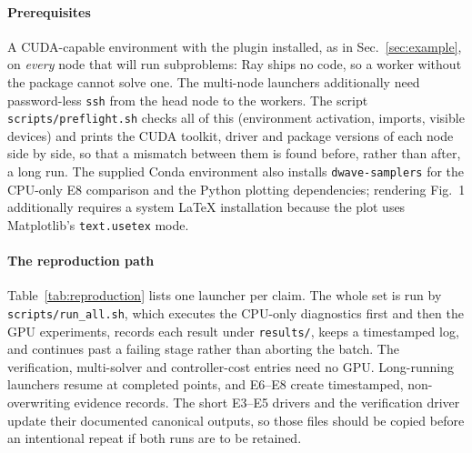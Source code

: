 \documentclass[12pt,a4paper]{elsarticle}
\begin{document}
\paragraph{Prerequisites}
A CUDA-capable environment with the plugin installed, as in
Sec.~\ref{sec:example}, on \emph{every} node that will run subproblems: Ray
ships no code, so a worker without the package cannot solve one. The
multi-node launchers additionally need password-less \texttt{ssh} from the head
node to the workers. The script \texttt{scripts/preflight.sh} checks all of
this (environment activation, imports, visible devices) and prints the CUDA
toolkit, driver and package versions of each node side by side, so that a
mismatch between them is found before, rather than after, a long run.
The supplied Conda environment also installs \texttt{dwave-samplers} for the CPU-only E8
comparison and the Python plotting dependencies; rendering Fig.~1 additionally requires a
system \LaTeX{} installation because the plot uses Matplotlib's \texttt{text.usetex} mode.

\paragraph{The reproduction path}
Table~\ref{tab:reproduction} lists one launcher per claim. The whole set is run
by \texttt{scripts/run\_all.sh}, which executes the CPU-only diagnostics first and then the
GPU experiments, records
each result under \texttt{results/}, keeps a timestamped log, and continues past
a failing stage rather than aborting the batch. The verification, multi-solver
and controller-cost entries need no GPU. Long-running launchers resume at completed points,
and E6--E8 create timestamped, non-overwriting evidence records. The short E3--E5 drivers and
the verification driver update their documented canonical outputs, so those files should be
copied before an intentional repeat if both runs are to be retained.
\end{document}
